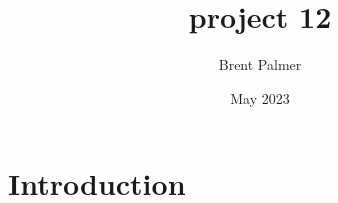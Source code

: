 \documentclass[12pt, twocolumn]{article}
\title{project 12}
\author{Brent Palmer}
\date{May 2023}
\begin{document}
\maketitle

\section{Introduction}

\lipsum[1-6]
\end{document}
